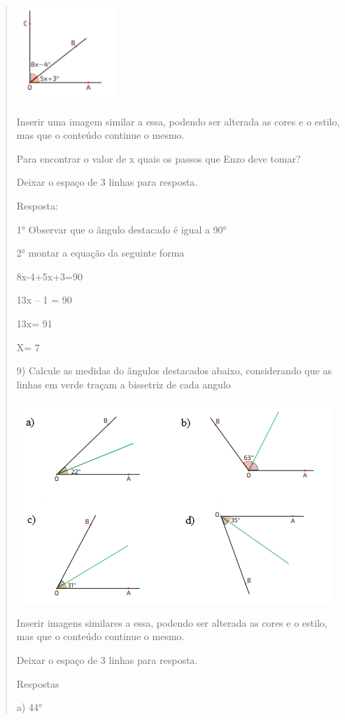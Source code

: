 \begin{quote}
\begin{escolha}
\includegraphics[width=1.47134in,height=1.42708in]{./imgSAEB_8_MAT/media/image31.png}

Inserir uma imagem similar a essa, podendo ser alterada as cores e o
estilo, mas que o conteúdo continue o mesmo.

Para encontrar o valor de x quais os passos que Enzo deve tomar?

Deixar o espaço de 3 linhas para resposta.

Resposta:

1° Observar que o ângulo destacado é igual a 90°

2° montar a equação da seguinte forma

8x-4+5x+3=90

13x -- 1 = 90

13x= 91

X= 7

9) Calcule as medidas do ângulos destacados abaixo, considerando que as
linhas em verde traçam a bissetriz de cada angulo

\includegraphics[width=4.66667in,height=3in]{./imgSAEB_8_MAT/media/image32.png}

Inserir imagens similares a essa, podendo ser alterada as cores e o
estilo, mas que o conteúdo continue o mesmo.

Deixar o espaço de 3 linhas para resposta.

Respostas

a) 44°


\end{escolha}
\end{quote}
